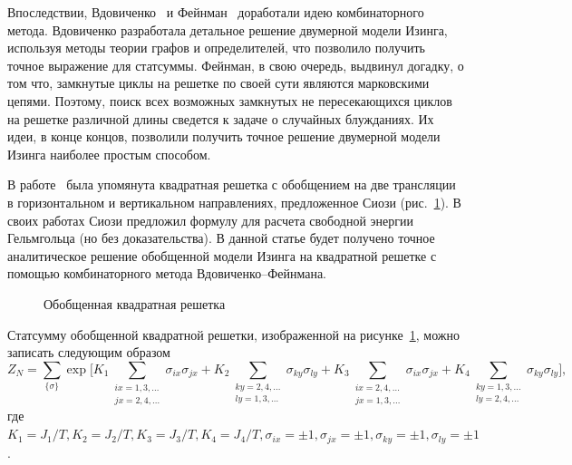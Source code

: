 \documentclass[utf8,12pt]{jetp}
\begin{document}
Впоследствии, Вдовиченко~\cite{vdovichenko1964, vdovichenko1965} и Фейнман~\cite{feynman1972} доработали идею комбинаторного метода. Вдовиченко разработала детальное решение двумерной модели Изинга, используя методы теории графов и определителей, что позволило получить точное выражение для статсуммы. Фейнман, в свою очередь, выдвинул догадку, о том что, замкнутые циклы на решетке по своей сути являются марковскими цепями. Поэтому, поиск всех возможных замкнутых не пересекающихся циклов на решетке различной длины сведется к задаче о случайных блужданиях. Их идеи, в конце концов, позволили получить точное решение двумерной модели Изинга наиболее простым способом.

В работе~\cite{generalizedIsing2021} была упомянута квадратная решетка с обобщением на две трансляции в горизонтальном и вертикальном направлениях, предложенное Сиози (рис.~\ref{gen}). В своих работах Сиози \cite{syozi1972} предложил формулу для расчета свободной энергии Гельмгольца (но без доказательства). В данной статье будет получено точное аналитическое решение обобщенной модели Изинга на квадратной решетке с помощью комбинаторного метода Вдовиченко--Фейнмана.

\begin{figure}[h]
	\caption{Обобщенная квадратная решетка}
	\label{gen}
\end{figure}

Статсумму обобщенной квадратной решетки, изображенной на рисунке~\ref{gen}, можно записать следующим образом 
\begin{equation}
Z_{N} = \sum_{\{\sigma\}} \exp{\bigg[ K_1 \sum_{\substack{ix = 1,3,\dots \\ jx = 2,4,\dots}} \sigma_{ix} \sigma_{jx} + K_2 \sum_{\substack{ky = 2,4,\dots \\ ly = 1,3,\dots}} \sigma_{ky} \sigma_{ly} + K_3 \sum_{\substack{ix = 2,4,\dots \\ jx = 1,3,\dots}} \sigma_{ix} \sigma_{jx} + K_4 \sum_{\substack{ky = 1,3,\dots \\ ly = 2,4,\dots}} \sigma_{ky} \sigma_{ly}\bigg]},
\label{partfunc}
\end{equation}
где $K_1 = J_1/T, K_2 = J_2/T, K_3 = J_3/T, K_4 = J_4/T, \sigma_{ix} = \pm 1, \sigma_{jx} = \pm 1, \sigma_{ky} = \pm 1, \sigma_{ly} = \pm 1$.
\end{document}
